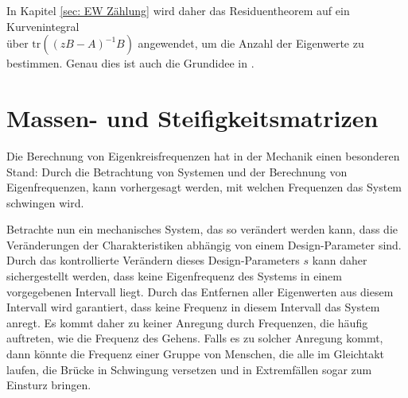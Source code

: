 \documentclass[a4paper,12pt]{report}
\newcommand{\tr}{\text{tr}}
\newcommand{\inv}{^{-1}}
\newcommand{\1}{\mathds{1}}
\theoremstyle{plain} %
\theoremstyle{definition} %
\theoremstyle{remark}
\begin{document}
            In Kapitel \ref{sec: EW Zählung} wird daher das Residuentheorem auf ein Kurvenintegral\\
            über $\tr((zB-A)\inv B)$ angewendet, um die Anzahl der Eigenwerte zu bestimmen.
            Genau dies ist auch die Grundidee in \cite{grundlageFutamura,hauptteilTkachuk}.
            
\chapter{Massen- und Steifigkeitsmatrizen}
\label{sec: MS Matrizen}
      Die Berechnung von Eigenkreisfrequenzen hat in der Mechanik einen besonderen Stand:
      Durch die Betrachtung von Systemen und der Berechnung von Eigenfrequenzen, kann vorhergesagt werden, mit welchen Frequenzen das System schwingen wird.

      Betrachte nun ein mechanisches System, das so verändert werden kann, dass die Veränderungen der Charakteristiken abhängig von einem Design-Parameter \s sind.
      Durch das kontrollierte Verändern dieses Design-Parameters $s$ kann daher sichergestellt werden, dass keine Eigenfrequenz des Systems in einem vorgegebenen Intervall liegt.
      Durch das Entfernen aller Eigenwerten aus diesem Intervall wird garantiert, dass keine Frequenz in diesem Intervall das System anregt.
      Es kommt daher zu keiner Anregung durch Frequenzen, die häufig auftreten, wie die Frequenz des Gehens.
      Falls es zu solcher Anregung kommt, dann könnte die Frequenz einer Gruppe von Menschen, die alle im Gleichtakt laufen,
      die Brücke in Schwingung versetzen und in Extremfällen sogar zum Einsturz bringen.
\end{document}
